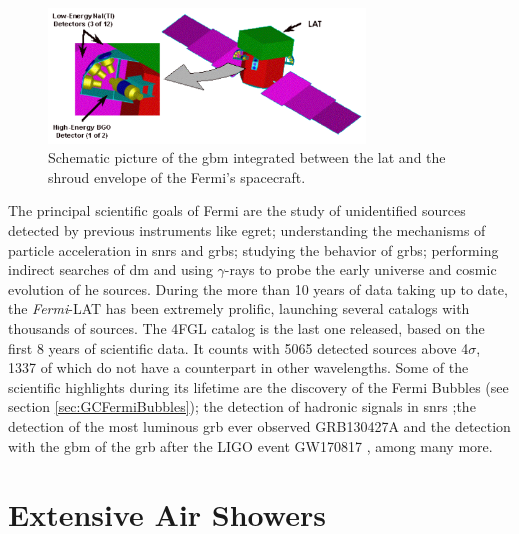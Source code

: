 \documentclass[main.tex]{subfiles}
\begin{document}
\begin{itemize}
  \begin{figure}[h]
    \centering
    \includegraphics[width=0.75\textwidth]{Pictures/GBM.pdf}
    \caption{Schematic picture of the \gls{gbm} integrated between the \gls{lat} and the shroud envelope of the Fermi's spacecraft.}
    \label{fig:GBM}
  \end{figure}

\end{itemize}

The principal scientific goals of Fermi are the study of unidentified sources detected by previous instruments like \gls{egret}; understanding the mechanisms of particle acceleration in \glspl{snr} and \glspl{grb}; studying the behavior of \glspl{grb}; performing indirect searches of \gls{dm} and using $\gamma$-rays to probe the early universe and cosmic evolution of \gls{he} sources.
During the more than 10 years of data taking up to date, the \textit{Fermi}-LAT has been extremely prolific, launching several catalogs with thousands of sources. The 4FGL catalog is the last one released, based on the first 8 years of scientific data. It counts with 5065 detected sources above 4$\sigma$, 1337 of which do not have a counterpart in other wavelengths. Some of the scientific highlights during its lifetime are the discovery of the Fermi Bubbles (see section \ref{sec:GCFermiBubbles}); the detection of hadronic signals in \glspl{snr} \cite{2013fermionSNRpiondecay};the detection of the most luminous \gls{grb} ever observed GRB130427A \cite{2014fermisuperGRB} and the detection with the \gls{gbm} of the \gls{grb} after the LIGO event GW170817 \cite{grb170817}, among many more.

\section{Extensive Air Showers} \label{sec:eas}
\end{document}
